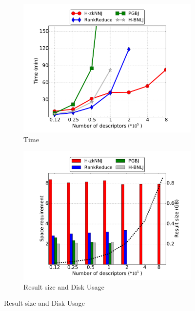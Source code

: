 \documentclass[10pt,journal,compsoc]{IEEEtran}
\begin{document}
%


\begin{figure}[htp]
	\centering
	\begin{subfigure}[b]{0.35\textwidth}
		\includegraphics[width=\textwidth]{time_surf.pdf}
		\caption{Time\label{fig:surf_data_time}}    
	\end{subfigure}%
	\begin{subfigure}[b]{0.35\textwidth}
		\includegraphics[width=\textwidth]{memory_surf.pdf}
		\caption{Result size and Disk Usage\label{fig:surf_data_memory}}
	\end{subfigure}%

\end{figure}
\end{document}
